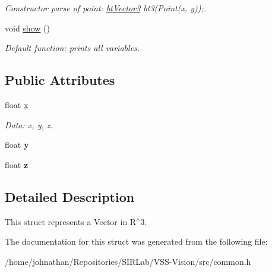 \begin{DoxyCompactItemize}
\begin{DoxyCompactList}\small\item\em Constructor parse of point\+: \hyperlink{structcommon_1_1btVector3}{bt\+Vector3} bt3(\+Point(x, y));. \end{DoxyCompactList}\item 
void \hyperlink{structcommon_1_1btVector3_ad182266905d95459f9ca03da9af47f35}{show} ()\hypertarget{structcommon_1_1btVector3_ad182266905d95459f9ca03da9af47f35}{}\label{structcommon_1_1btVector3_ad182266905d95459f9ca03da9af47f35}

\begin{DoxyCompactList}\small\item\em Default function\+: prints all variables. \end{DoxyCompactList}\end{DoxyCompactItemize}
\subsection*{Public Attributes}
\begin{DoxyCompactItemize}
\item 
float \hyperlink{structcommon_1_1btVector3_adbe23ed6ae54734cbdf7b37788e0c702}{x}\hypertarget{structcommon_1_1btVector3_adbe23ed6ae54734cbdf7b37788e0c702}{}\label{structcommon_1_1btVector3_adbe23ed6ae54734cbdf7b37788e0c702}

\begin{DoxyCompactList}\small\item\em Data\+: x, y, z. \end{DoxyCompactList}\item 
float {\bfseries y}\hypertarget{structcommon_1_1btVector3_a5b52b09733d198cde3d283c0b2b320d1}{}\label{structcommon_1_1btVector3_a5b52b09733d198cde3d283c0b2b320d1}

\item 
float {\bfseries z}\hypertarget{structcommon_1_1btVector3_aa03665d96dd5d3dd2dbaeb6e9f24f4bc}{}\label{structcommon_1_1btVector3_aa03665d96dd5d3dd2dbaeb6e9f24f4bc}

\end{DoxyCompactItemize}


\subsection{Detailed Description}
This struct represents a Vector in R$^\wedge$3. 

The documentation for this struct was generated from the following file\+:\begin{DoxyCompactItemize}
\item 
/home/johnathan/\+Repositories/\+S\+I\+R\+Lab/\+V\+S\+S-\/\+Vision/src/common.\+h\end{DoxyCompactItemize}
